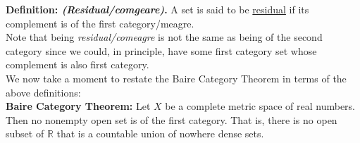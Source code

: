 \documentclass[12pt]{article}
\newlength\tindent
\renewcommand{\indent}{\hspace*{\tindent}}
\newcommand{\R}{\mathbb R}
\begin{document}
%
%
{\bf Definition: {\em (Residual/comgeare)}.} A set is said to be \underline{residual} if its complement is of the first category/meagre. \\

\indent Note that being {\em residual/comeagre} is not the same as being of the second category since we could, in principle, have some first category set whose complement is also first category. \\

\indent We now take a moment to restate the Baire Category Theorem in terms of the above definitions: \\

%
%
{\bf Baire Category Theorem:} Let $X$ be a complete metric space of real numbers. Then no nonempty open set is of the first category. That is, there is no open subset of $\R$ that is a countable union of nowhere dense sets. \\
\end{document}
